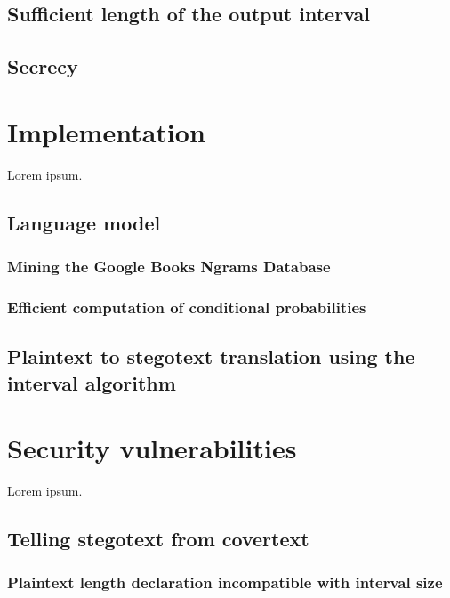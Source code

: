 \documentclass{IIBproject}
\begin{document}
\subsection{Sufficient length of the output interval}

\subsection{Secrecy}

\section{Implementation}

Lorem ipsum.

\subsection{Language model}

\subsubsection{Mining the Google Books Ngrams Database}

\subsubsection{Efficient computation of conditional probabilities}

\subsection{Plaintext to stegotext translation using the interval algorithm}

\section{Security vulnerabilities}

Lorem ipsum.

\subsection{Telling stegotext from covertext}

\subsubsection{Plaintext length declaration incompatible with interval size}
\end{document}

